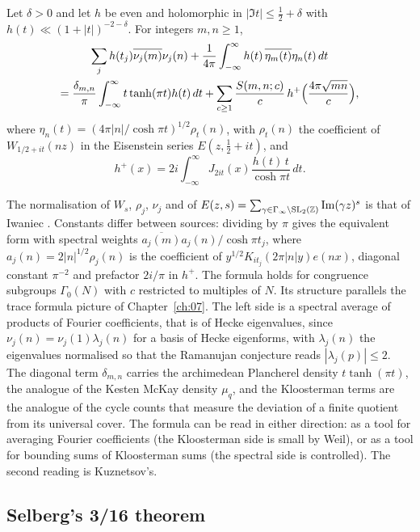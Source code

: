 \begin{theorem}\label{thm:06bkuznetsov}
Let $\delta>0$ and let $h$ be even and holomorphic in $|\Im t|\le\frac12+\delta$ with $h(t)\ll(1+|t|)^{-2-\delta}$. For integers $m,n\ge1$,
\begin{multline*}
\sum_j h(t_j)\overline{\nu_j(m)}\nu_j(n)+\frac{1}{4\pi}\int_{-\infty}^{\infty}h(t)\,\overline{\eta_m(t)}\eta_n(t)\,dt\\
=\frac{\delta_{m,n}}{\pi}\int_{-\infty}^\infty t\tanh(\pi t)h(t)\,dt+\sum_{c\ge1}\frac{S(m,n;c)}{c}\,h^+\Bigl(\frac{4\pi\sqrt{mn}}{c}\Bigr),
\end{multline*}
where $\eta_n(t)=(4\pi|n|/\cosh\pi t)^{1/2}\rho_t(n)$, with $\rho_t(n)$ the coefficient of $W_{1/2+it}(nz)$ in the Eisenstein series $E(z,\frac12+it)$, and
\[
h^+(x)=2i\int_{-\infty}^\infty J_{2it}(x)\frac{h(t)\,t}{\cosh\pi t}\,dt .
\]
\end{theorem}

The normalisation of $W_s$, $\rho_j$, $\nu_j$ and of $E(z,s)=\sum_{\gamma\in\Gamma_\infty\backslash\mathrm{SL}_2(\mathbb{Z})}\operatorname{Im}(\gamma z)^s$ is that of Iwaniec \cite{iwaniec2002}. Constants differ between sources: dividing by $\pi$ gives the equivalent form with spectral weights $\overline{a_j(m)}a_j(n)/\cosh\pi t_j$, where $a_j(n)=2|n|^{1/2}\rho_j(n)$ is the coefficient of $y^{1/2}K_{it_j}(2\pi|n|y)e(nx)$, diagonal constant $\pi^{-2}$ and prefactor $2i/\pi$ in $h^+$. The formula holds for congruence subgroups $\Gamma_0(N)$ with $c$ restricted to multiples of $N$. Its structure parallels the trace formula picture of Chapter~\ref{ch:07}. The left side is a spectral average of products of Fourier coefficients, that is of Hecke eigenvalues, since $\nu_j(n)=\nu_j(1)\lambda_j(n)$ for a basis of Hecke eigenforms, with $\lambda_j(n)$ the eigenvalues normalised so that the Ramanujan conjecture reads $|\lambda_j(p)|\le2$. The diagonal term $\delta_{m,n}$ carries the archimedean Plancherel density $t\tanh(\pi t)$, the analogue of the Kesten McKay density $\mu_q$, and the Kloosterman terms are the analogue of the cycle counts that measure the deviation of a finite quotient from its universal cover. The formula can be read in either direction: as a tool for averaging Fourier coefficients (the Kloosterman side is small by Weil), or as a tool for bounding sums of Kloosterman sums (the spectral side is controlled). The second reading is Kuznetsov's.

\subsection{Selberg's 3/16 theorem}

